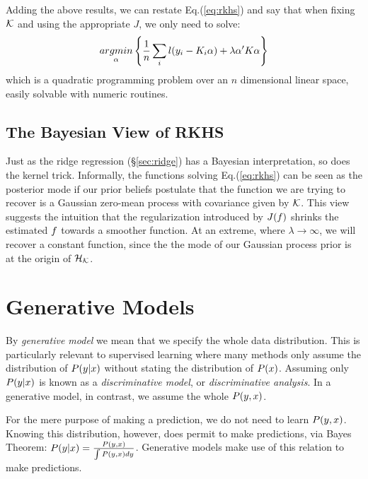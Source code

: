 Adding the above results, we can restate Eq.(\ref{eq:rkhs}) and say that when fixing $\mathcal{K}$ and using the appropriate $J$, we only need to solve: 
\begin{align}	
\label{eq:rkhs_simple}
		\mathop{argmin} _{\alpha}\left\{ \frac{1}{n} \sum_i l(y_i-K_i \alpha) + \lambda \alpha' K \alpha  \right\}
\end{align}
which is a quadratic programming problem over an $n$ dimensional linear space, easily solvable with numeric routines.


\section{The Bayesian View of RKHS}
Just as the ridge regression (\S\ref{sec:ridge}) has a Bayesian interpretation, so does the kernel trick.
Informally, the functions solving Eq.(\ref{eq:rkhs}) can be seen as the posterior mode if our prior beliefs postulate that the function we are trying to recover is a Gaussian zero-mean process with covariance given by $\mathcal{K}$.
This view suggests the intuition that the regularization introduced by $J(f)$ shrinks the estimated $f$ towards a smoother function. At an extreme, where $\lambda\to\infty$, we will recover a constant function, since the the mode of our Gaussian process prior is at the origin of $\mathcal{H}_{\mathcal{K}}$.





\chapter{Generative Models}
\label{apx:generative_concept}

By \emph{generative model} we mean that we specify the whole data distribution. This is particularly relevant to supervised learning where many methods only assume the distribution of $P(y|x)$ without stating the distribution of $P(x)$.
Assuming only $P(y|x)$ is known as a \emph{discriminative model}, or \emph{discriminative analysis}.
In a generative model, in contrast, we assume the whole $P(y,x)$.

For the mere purpose of making a prediction, we do not need to learn $P(y,x)$. 
Knowing this distribution, however, does permit to make predictions, via Bayes Theorem: 
$P(y|x)=\frac{P(y,x)}{\int P(y,x)dy}$.
Generative models make use of this relation to make predictions. 

